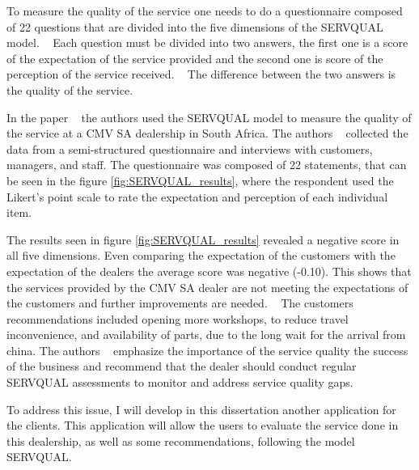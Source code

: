 To measure the quality of the service one needs to do a questionnaire composed of 22 questions that are divided into the five dimensions of the SERVQUAL model. ~\cite{Measuring_After_sales_Service_Quality}
Each question must be divided into two answers, the first one is a score of the expectation of the service provided and the second one is score of the perception of the service received. ~\cite{Measuring_After_sales_Service_Quality}
The difference between the two answers is the quality of the service. ~\cite{servqual_blog_da_qualidade} ~\cite{Measuring_After_sales_Service_Quality} ~\cite{SERVQUAL_OLD}

In the paper ~\citet{Measuring_After_sales_Service_Quality} the authors used the SERVQUAL model to measure the quality of the service at a CMV SA dealership in South Africa.
The authors ~\citet{Measuring_After_sales_Service_Quality} collected the data from a semi-structured questionnaire and interviews with customers, managers, and staff.
The questionnaire was composed of 22 statements, that can be seen in the figure \ref{fig:SERVQUAL_results}, where the respondent used the Likert's point scale to rate the expectation and perception of each individual item.

The results seen in figure \ref{fig:SERVQUAL_results} revealed a negative score in all five dimensions. 
Even comparing the expectation of the customers with the expectation of the dealers the average score was negative (-0.10).
This shows that the services provided by the CMV SA dealer are not meeting the expectations of the customers and further improvements are needed. ~\cite{Measuring_After_sales_Service_Quality}
The customers recommendations included opening more workshops, to reduce travel inconvenience, and availability of parts, due to the long wait for the arrival from china.
The authors ~\citet{Measuring_After_sales_Service_Quality} emphasize the importance of the service quality the success of the business and recommend that the dealer should conduct regular SERVQUAL assessments to monitor and address service quality gaps. ~\cite{Measuring_After_sales_Service_Quality}

To address this issue, I will develop in this dissertation another application for the clients. 
This application will allow the users to evaluate the service done in this dealership, as well as some recommendations, following the model SERVQUAL. 

